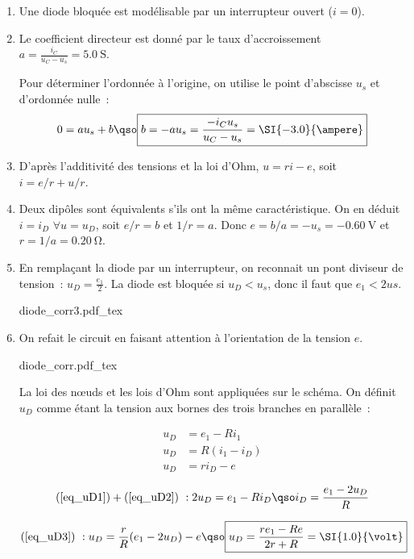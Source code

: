 \documentclass[a4paper, 10pt, garamond, oneside]{book}
\begin{document}
{
	\begin{enumerate}
		\item Une diode bloquée est modélisable par un interrupteur ouvert ($i=0$).
		\item Le coefficient directeur est donné par le taux d'accroissement
		      $\boxed{a=\frac{i_C}{u_C-u_s}=\SI{5.0}{\siemens}}$.

		      Pour déterminer l'ordonnée à l'origine, on utilise le point
		      d'abscisse $u_s$ et d'ordonnée nulle~:
		      \[
			      0=au_s+b\qso
			      \boxed{b=-au_s=\frac{-i_Cu_s}{u_C-u_s}=\SI{-3.0}{\ampere}}
		      \]
		\item D'après l'additivité des tensions et la loi d'Ohm, $u=ri-e$, soit
		      $\boxed{i=e/r+u/r}$.
		\item Deux dipôles sont équivalents s'ils ont la même caractéristique. On
		      en déduit $i=i_D$ $\forall u=u_D$, soit $e/r=b$ et $1/r=a$. Donc
		      $\boxed{e=b/a=-u_s=\SI{-0,60}{\volt}}$ et $\boxed{r=1/a=\SI{0,20}{\ohm}}$.
		\item En remplaçant la diode par un interrupteur, on reconnait un pont
		      diviseur de tension~: $u_D=\frac{e_1}{2}$. La diode est bloquée si
		      $u_D<u_s$, donc il faut que $\boxed{e_1<2us}$.
		      \begin{center}
			      {diode_corr3.pdf_tex}
		      \end{center}
		\item On refait le circuit en faisant attention à l'orientation de la
		      tension $e$.
		      \begin{center}
			      {diode_corr.pdf_tex}
		      \end{center}

		      La loi des nœuds et les lois d'Ohm sont appliquées sur le schéma.
		      On définit $u_D$ comme étant la tension aux bornes des trois
		      branches en parallèle~:

		      \begin{align}
			      u_D & =e_1-Ri_1\label{eq_uD1}   \\
			      u_D & =R(i_1-i_D)\label{eq_uD2} \\
			      u_D & =ri_D-e\label{eq_uD3}
		      \end{align}


		      \[
			      (\ref{eq_uD1})+(\ref{eq_uD2})~: 2u_D=e_1-Ri_D
			      \qso  i_D=\frac{e_1-2u_D}{R}
		      \]

		      \[
			      (\ref{eq_uD3})~: u_D=\frac{r}{R}(e_1-2u_D)-e
			      \qso \boxed{u_D=\frac{re_1-Re}{2r+R}=\SI{1.0}{\volt}}
		      \]


\end{enumerate}}
\end{document}
